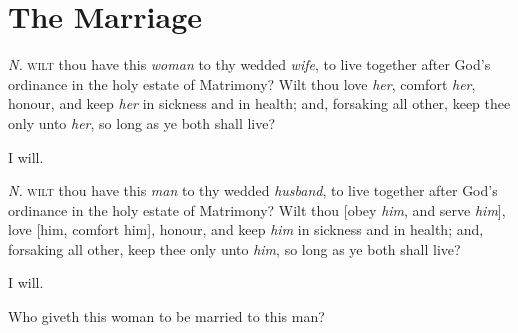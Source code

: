 
{\footnotesize{}\par} %

\section{The Marriage}

\lettrine{\emph{N.}}{ wilt} thou have this \emph{woman} to thy wedded \emph{wife}, to live together after God’s ordinance in the holy estate of Matrimony? Wilt thou love \emph{her}, comfort \emph{her}, honour, and keep \emph{her} in sickness and in health; and, forsaking all other, keep thee only unto \emph{her}, so long as ye both shall live?

\centerline{ I will.}

\medskip

\centerline{}
\lettrine{\emph{N.}}{ wilt} thou have this \emph{man} to thy wedded \emph{husband}, to live together after God’s ordinance in the holy estate of Matrimony? Wilt thou [obey \emph{him}, and serve \emph{him}], love [him, comfort him], honour, and keep \emph{him} in sickness and in health; and, forsaking all other, keep thee only unto \emph{him}, so long as ye both shall live?
\centerline{ I will.}


\begin{leftbar}
\centerline{} %
\centerline{Who giveth this woman to be married to this man?}
\end{leftbar}



\smallskip

